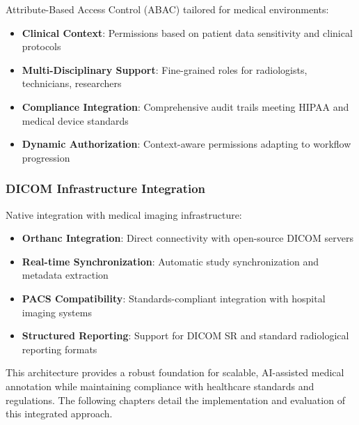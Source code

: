 Attribute-Based Access Control (ABAC) tailored for medical environments:

\begin{itemize}
    \item \textbf{Clinical Context}: Permissions based on patient data sensitivity and clinical protocols
    \item \textbf{Multi-Disciplinary Support}: Fine-grained roles for radiologists, technicians, researchers
    \item \textbf{Compliance Integration}: Comprehensive audit trails meeting HIPAA and medical device standards
    \item \textbf{Dynamic Authorization}: Context-aware permissions adapting to workflow progression
\end{itemize}

\subsubsection{DICOM Infrastructure Integration}

Native integration with medical imaging infrastructure:

\begin{itemize}
    \item \textbf{Orthanc Integration}: Direct connectivity with open-source DICOM servers
    \item \textbf{Real-time Synchronization}: Automatic study synchronization and metadata extraction
    \item \textbf{PACS Compatibility}: Standards-compliant integration with hospital imaging systems
    \item \textbf{Structured Reporting}: Support for DICOM SR and standard radiological reporting formats
\end{itemize}

This architecture provides a robust foundation for scalable, AI-assisted medical annotation while maintaining compliance with healthcare standards and regulations. The following chapters detail the implementation and evaluation of this integrated approach.


